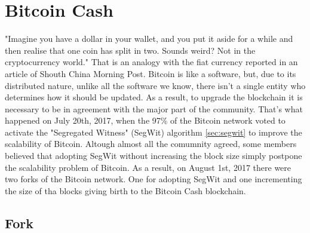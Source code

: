 \chapter{Bitcoin Cash}
\label{cha:bch}

"Imagine you have a dollar in your wallet, and you put it aside for a while and 
then realise that one coin has split in two. Sounds weird? Not in the cryptocurrency 
world." That is an analogy with the fiat currency reported in an article of 
Shouth China Morning Post\cite{scmp}.
Bitcoin is like a software, but, due to its distributed nature, unlike all the 
software we know, there isn't a single entity who determines how it should be 
updated. As a result, to upgrade the blockchain it is necessary to be in 
agreement with the major part of the community. That's what happened on July 20th,
2017, when the 97\% of the Bitcoin network voted to activate the "Segregated 
Witness" (SegWit) algorithm \ref{sec:segwit} to improve the scalability of Bitcoin. Altough almost 
all the comumnity agreed, some members believed that adopting SegWit without 
increasing the block size simply postpone the scalability problem of Bitcoin.
As a result, on August 1st, 2017 there were two forks of the Bitcoin network. 
One for adopting SegWit and one incrementing the size of tha blocks giving 
birth to the Bitcoin Cash blockchain.\cite{scmp}\cite{thecryptonomist}

\section{Fork}
\label{sec:fork}

